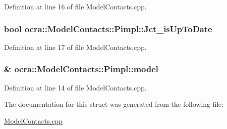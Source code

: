 Definition at line 16 of file Model\+Contacts.\+cpp.

\subsubsection[{\texorpdfstring{Jct\+\_\+is\+Up\+To\+Date}{Jct_isUpToDate}}]{\setlength{\rightskip}{0pt plus 5cm}bool ocra\+::\+Model\+Contacts\+::\+Pimpl\+::\+Jct\+\_\+is\+Up\+To\+Date}\hypertarget{structocra_1_1ModelContacts_1_1Pimpl_ac0fa66cfb8b54718dd3a03c683819c6d}{}\label{structocra_1_1ModelContacts_1_1Pimpl_ac0fa66cfb8b54718dd3a03c683819c6d}


Definition at line 17 of file Model\+Contacts.\+cpp.

\subsubsection[{\texorpdfstring{model}{model}}]{\& ocra\+::\+Model\+Contacts\+::\+Pimpl\+::model}\hypertarget{structocra_1_1ModelContacts_1_1Pimpl_a16998d1fe02ccbb3a3f2282d5ddc5074}{}\label{structocra_1_1ModelContacts_1_1Pimpl_a16998d1fe02ccbb3a3f2282d5ddc5074}


Definition at line 14 of file Model\+Contacts.\+cpp.



The documentation for this struct was generated from the following file\+:\begin{DoxyCompactItemize}
\item 
\hyperlink{ModelContacts_8cpp}{Model\+Contacts.\+cpp}\end{DoxyCompactItemize}
